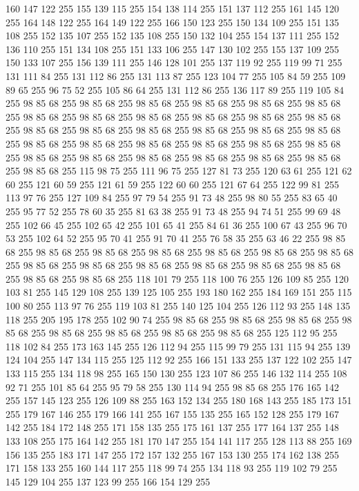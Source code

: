 160 147 122 255 155 139 115 255 154 138 114 255 151 137 112 255 161 145 120 255 164 148 122 255 164 149 122 255 166 150 123 255 150 134 109 255 151 135 108 255 152 135 107 255 152 135 108 255 150 132 104 255 154 137 111 255 152 136 110 255 151 134 108 255 151 133 106 255 147 130 102 255 155 137 109 255 150 133 107 255 156 139 111 255 146 128 101 255 137 119 92 255 119 99 71 255 131 111 84 255 131 112 86 255 131 113 87 255 123 104 77 255 105 84 59 255 109 89 65 255 96 75 52 255 105 86 64 255 131 112 86 255 136 117 89 255 119 105 84 255 98 85 68 255 98 85 68 255 98 85 68 255 98 85 68 255 98 85 68 255 98 85 68 255 98 85 68 255 98 85 68 255 98 85 68 255 98 85 68 255 98 85 68 255 98 85 68 255 98 85 68 255 98 85 68 255 98 85 68 255 98 85 68 255 98 85 68 255 98 85 68 255 98 85 68 255 98 85 68 255 98 85 68 255 98 85 68 255 98 85 68 255 98 85 68 255 98 85 68 255 98 85 68 255 98 85 68 255 98 85 68 255 98 85 68 255
98 85 68 255 98 85 68 255 115 98 75 255 111 96 75 255 127 81 73 255 120 63 61 255 121 62 60 255 121 60 59 255 121 61 59 255 122 60 60 255 121 67 64 255 122 99 81 255 113 97 76 255 127 109 84 255 97 79 54 255 91 73 48 255 98 80 55 255 83 65 40 255 95 77 52 255 78 60 35 255 81 63 38 255 91 73 48 255 94 74 51 255 99 69 48 255 102 66 45 255 102 65 42 255 101 65 41 255 84 61 36 255 100 67 43 255 96 70 53 255 102 64 52 255 95 70 41 255 91 70 41 255 76 58 35 255 63 46 22 255 98 85 68 255 98 85 68 255 98 85 68 255 98 85 68 255 98 85 68 255 98 85 68 255 98 85 68 255 98 85 68 255 98 85 68 255 98 85 68 255 98 85 68 255 98 85 68 255 98 85 68 255 98 85 68 255 98 85 68 255 118 101 79 255 118 100 76 255 126 109 85 255 120 103 81 255 145 129 108 255 139 125 105 255 193 180 162 255 184 169 151 255 115 100 80 255 113 97 76 255 119 103 81 255 140 125 104 255 126 112 93 255 148 135 118 255
205 195 178 255 102 90 74 255 98 85 68 255 98 85 68 255 98 85 68 255 98 85 68 255 98 85 68 255 98 85 68 255 98 85 68 255 98 85 68 255 125 112 95 255 118 102 84 255 173 163 145 255 126 112 94 255 115 99 79 255 131 115 94 255 139 124 104 255 147 134 115 255 125 112 92 255 166 151 133 255 137 122 102 255 147 133 115 255 134 118 98 255 165 150 130 255 123 107 86 255 146 132 114 255 108 92 71 255 101 85 64 255 95 79 58 255 130 114 94 255 98 85 68 255 176 165 142 255 157 145 123 255 126 109 88 255 163 152 134 255 180 168 143 255 185 173 151 255 179 167 146 255 179 166 141 255 167 155 135 255 165 152 128 255 179 167 142 255 184 172 148 255 171 158 135 255 175 161 137 255 177 164 137 255 148 133 108 255 175 164 142 255 181 170 147 255 154 141 117 255 128 113 88 255 169 156 135 255 183 171 147 255 172 157 132 255 167 153 130 255 174 162 138 255 171 158 133 255 160 144 117 255 118 99 74 255 134 118 93 255 119 102 79 255 145 129 104 255 137 123 99 255 166 154 129 255
